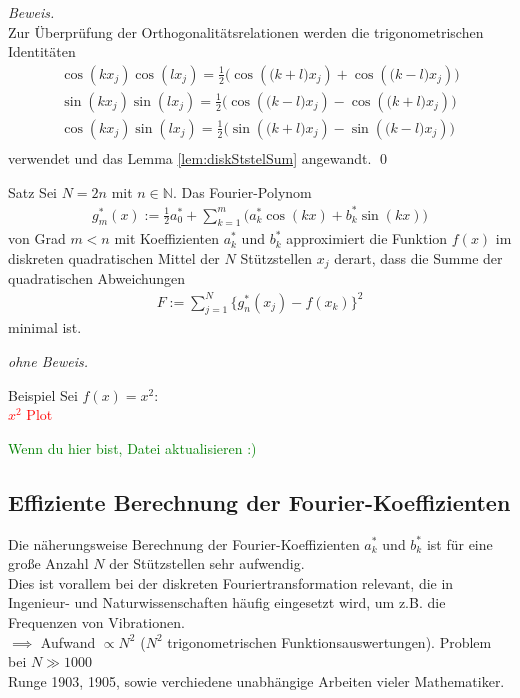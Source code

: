 \textit{Beweis.} \\
Zur Überprüfung der Orthogonalitätsrelationen werden die trigonometrischen Identitäten
\begin{align*}
  \cos(kx_j)\cos(lx_j) = \tfrac{1}{2}\Big(\cos(\big(k+l\big)x_j) + \cos(\big(k-l\big)x_j)\Big) \\
  \sin(kx_j)\sin(lx_j) = \tfrac{1}{2}\Big(\cos(\big(k-l\big)x_j) - \cos(\big(k+l\big)x_j)\Big) \\
  \cos(kx_j)\sin(lx_j) = \tfrac{1}{2}\Big(\sin(\big(k+l\big)x_j) - \sin(\big(k-l\big)x_j)\Big) \\
\end{align*}
verwendet und das Lemma \ref{lem:diskStstelSum} angewandt.
\qed 

\begin{colbox}{Satz}
  Sei $N=2n$ mit $n\in\mathbb{N}$. Das Fourier-Polynom
  \begin{align*}
  g_m^*(x) := \tfrac{1}{2}a^*_0 + \sum_{k=1}^{m}\Big(a^*_k\cos(kx)+b^*_k\sin(kx)\Big)
  \end{align*}
  von Grad $m<n$ mit Koeffizienten $a_k^*$ und $b^*_k$ approximiert die Funktion $f(x)$ im diskreten quadratischen 
  Mittel der $N$ Stützstellen $x_j$ derart, dass die Summe der quadratischen Abweichungen 
  \begin{align*}
    F:=\sum_{j=1}^{N}\{g^*_n(x_j)-f(x_k)\}^2
  \end{align*}
  minimal ist.
\end{colbox}
\textit{ohne Beweis.}


\begin{colbox}{Beispiel}
  Sei $f(x)=x^2$: \\
  \textcolor{red}{$x^2$ Plot} 
\end{colbox}
\textcolor{green}{Wenn du hier bist, Datei aktualisieren :)}

\subsection{Effiziente Berechnung der Fourier-Koeffizienten}
Die näherungsweise Berechnung der Fourier-Koeffizienten $a_k^*$ und $b_k^*$ ist für eine große Anzahl $N$ der 
Stützstellen sehr aufwendig. \\
Dies ist vorallem bei der diskreten Fouriertransformation relevant, die in Ingenieur- und Naturwissenschaften 
häufig eingesetzt wird, um z.B. die Frequenzen von Vibrationen. \\
$\implies$ Aufwand $\propto N^2$ ($N^2$ trigonometrischen Funktionsauswertungen). Problem bei $N\gg 1000$ \\
Runge 1903, 1905, sowie verchiedene unabhängige Arbeiten vieler Mathematiker.
